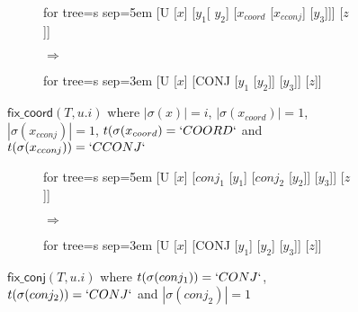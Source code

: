 \begin{figure}[htb]
	\centering
	\begin{subfigure}[c]{0.4\textwidth}
		\centering
		\begin{adjustbox}{valign=c, max width=\textwidth}
			\begin{forest}
			for tree={s sep=5em}
			[U [$x$] [$y_1$[ $y_2$] [$x_{coord}$ [$x_{cconj}$] [$y_3$]]] [$z$]]
			\end{forest}
		\end{adjustbox}
		\caption*{}
	\end{subfigure}
	\begin{subfigure}[c]{0.1\textwidth}
		\centering
		\huge{$\Rightarrow$}
	\end{subfigure}
	\begin{subfigure}[c]{0.4\textwidth}
		\centering
		\begin{adjustbox}{valign=c, max width=\textwidth}
			\begin{forest}
			for tree={s sep=3em}
            [U [$x$] [CONJ [$y_1$ [$y_2$]] [$y_3$]] [$z$]]
			\end{forest}
		\end{adjustbox}
		\caption*{}
	\end{subfigure}
	\caption{$\textsf{fix\_coord}(T, u.i)$ where $|\sigma(x)| = i$, $|\sigma(x_{coord})| = 1$, $|\sigma(x_{cconj})| = 1$, $t(\sigma(x_{coord}) = `COORD`$ and $t(\sigma(x_{cconj})) = `CCONJ`$}
	\label{fig:sch:op:fixCoord}
\end{figure}

\begin{figure}[htb]
	\centering
	\begin{subfigure}[c]{0.4\textwidth}
		\centering
		\begin{adjustbox}{valign=c, max width=\textwidth}
			\begin{forest}
			for tree={s sep=5em}
			[U [$x$] [$conj_1$ [$y_1$] [$conj_2$ [$y_2$]] [$y_3$]] [$z$]]
			\end{forest}
		\end{adjustbox}
		\caption*{}
	\end{subfigure}
	\begin{subfigure}[c]{0.1\textwidth}
		\centering
		\huge{$\Rightarrow$}
	\end{subfigure}
	\begin{subfigure}[c]{0.4\textwidth}
		\centering
		\begin{adjustbox}{valign=c, max width=\textwidth}
			\begin{forest}
			for tree={s sep=3em}
            [U [$x$] [CONJ [$y_1$] [$y_2$] [$y_3$]] [$z$]]
			\end{forest}
		\end{adjustbox}
		\caption*{}
	\end{subfigure}
	\caption{$\textsf{fix\_conj}(T, u.i)$ where $t(\sigma(conj_1)) = `CONJ`$, $t(\sigma(conj_2)) = `CONJ`$ and $|\sigma(conj_2)| = 1$}
	\label{fig:sch:op:fixConj}
\end{figure}

